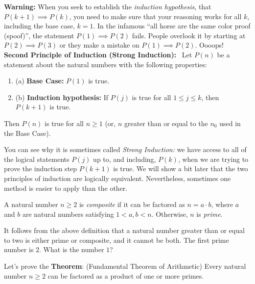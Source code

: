       
\textbf{Warning:} When you seek to establish the \emph{induction hypothesis}, that $P(k+1) \implies P(k)$, you need to make sure that your reasoning works for all $k$, including the base case, $k=1$. In the infamous ``all horse are the same color proof (spoof)'', the statement $P(1) \implies P(2)$ fails. People overlook it by starting at $P(2) \implies P(3)$ or they make a mistake on $P(1) \implies P(2)$. Oooops! \\


\noindent \textbf{Second Principle of Induction (Strong Induction):}~ Let $P(n)$ be a statement about the natural numbers with the following properties:
    \begin{enumerate}
        \item[] (a) \textbf{Base Case:} $P(1)$ is true.
        \item[] (b) \textbf{Induction hypothesis:} If $P(j)$ is true for all $1\leq j\leq k$, then $P(k+1)$ is true.
    \end{enumerate}
Then $P(n)$ is true for all $n\geq 1$ (or, $n$ greater than or equal to the  $n_0$ used in the Base Case).\\

\begin{rem}
You can see why it is sometimes called \emph{Strong Induction:}  we have access to all of the logical statements $P(j)$ up to, and including, $P(k)$, when we are trying to prove the induction step $P(k+1)$ is true. We will show a bit later that the two principles of induction are logically equivalent. Nevertheless, sometimes one method is easier to apply than the other.
\end{rem}

\begin{definition}
A natural number $n \ge 2$ is \emph{composite} if it can be factored as $n=a\cdot b$, where $a$ and $b$ are natural numbers satisfying $1 < a,  b < n$. Otherwise, $n$ is \emph{prime}.
\end{definition} 

\begin{rem}
It follows from the above definition that a natural number greater than or equal to two is either prime or composite, and it cannot be both. The first prime number is $2$. What is the number $1$?
\end{rem} 

\vspace*{.2cm}
\begin{example} 
Let's prove the \textbf{Theorem}: (Fundamental Theorem of Arithmetic) Every natural number $n\geq 2$ can be factored as a product of one or more primes.
\end{example}

